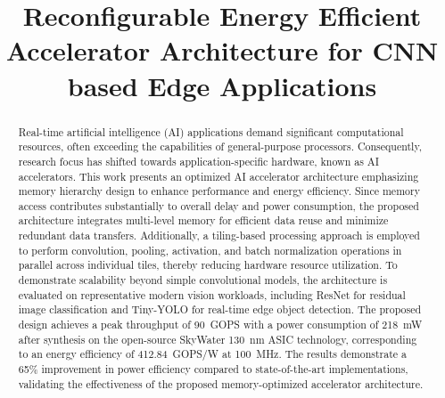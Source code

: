 \documentclass[conference]{IEEEtran}
\begin{document}
\title{Reconfigurable Energy Efficient Accelerator Architecture for CNN based Edge Applications
}

\author{
\and
{}
\and
{}
}
\maketitle
\begin{abstract}
Real-time artificial intelligence (AI) applications demand significant computational resources, often exceeding the capabilities of general-purpose processors. Consequently, research focus has shifted towards application-specific hardware, known as AI accelerators. This work presents an optimized AI accelerator architecture emphasizing memory hierarchy design to enhance performance and energy efficiency. Since memory access contributes substantially to overall delay and power consumption, the proposed architecture integrates multi-level memory for efficient data reuse and minimize redundant data transfers. Additionally, a tiling-based processing approach is employed to perform convolution, pooling, activation, and batch normalization operations in parallel across individual tiles, thereby reducing hardware resource utilization. To demonstrate scalability beyond simple convolutional models, the architecture is evaluated on representative modern vision workloads, including ResNet for residual image classification and Tiny-YOLO for real-time edge object detection. The proposed design achieves a peak throughput of 90~GOPS with a power consumption of 218~mW after synthesis on the open-source SkyWater 130~nm ASIC technology, corresponding to an energy efficiency of 412.84~GOPS/W at 100~MHz. The results demonstrate a 65\% improvement in power efficiency compared to state-of-the-art implementations, validating the effectiveness of the proposed memory-optimized accelerator architecture.
\end{abstract}
\end{document}
